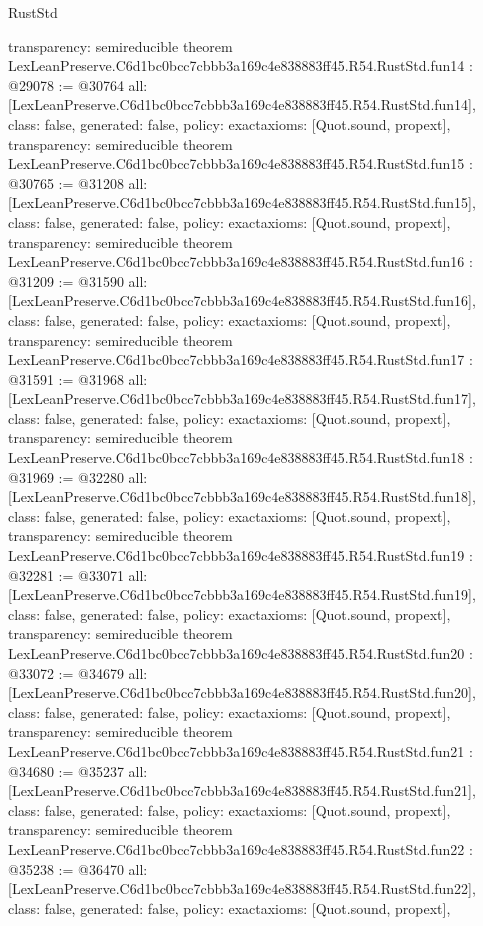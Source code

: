 \begin{lexlean}{RustStd}
\begin{coremodule}
{  transparency: semireducible
}
theorem LexLeanPreserve.C6d1bc0bcc7cbbb3a169c4e838883ff45.R54.RustStd.fun14 : @29078 := @30764 {
  all: [LexLeanPreserve.C6d1bc0bcc7cbbb3a169c4e838883ff45.R54.RustStd.fun14],
  class: false,
  generated: false,
  policy: exact{axioms: [Quot.sound, propext]},
  transparency: semireducible
}
theorem LexLeanPreserve.C6d1bc0bcc7cbbb3a169c4e838883ff45.R54.RustStd.fun15 : @30765 := @31208 {
  all: [LexLeanPreserve.C6d1bc0bcc7cbbb3a169c4e838883ff45.R54.RustStd.fun15],
  class: false,
  generated: false,
  policy: exact{axioms: [Quot.sound, propext]},
  transparency: semireducible
}
theorem LexLeanPreserve.C6d1bc0bcc7cbbb3a169c4e838883ff45.R54.RustStd.fun16 : @31209 := @31590 {
  all: [LexLeanPreserve.C6d1bc0bcc7cbbb3a169c4e838883ff45.R54.RustStd.fun16],
  class: false,
  generated: false,
  policy: exact{axioms: [Quot.sound, propext]},
  transparency: semireducible
}
theorem LexLeanPreserve.C6d1bc0bcc7cbbb3a169c4e838883ff45.R54.RustStd.fun17 : @31591 := @31968 {
  all: [LexLeanPreserve.C6d1bc0bcc7cbbb3a169c4e838883ff45.R54.RustStd.fun17],
  class: false,
  generated: false,
  policy: exact{axioms: [Quot.sound, propext]},
  transparency: semireducible
}
theorem LexLeanPreserve.C6d1bc0bcc7cbbb3a169c4e838883ff45.R54.RustStd.fun18 : @31969 := @32280 {
  all: [LexLeanPreserve.C6d1bc0bcc7cbbb3a169c4e838883ff45.R54.RustStd.fun18],
  class: false,
  generated: false,
  policy: exact{axioms: [Quot.sound, propext]},
  transparency: semireducible
}
theorem LexLeanPreserve.C6d1bc0bcc7cbbb3a169c4e838883ff45.R54.RustStd.fun19 : @32281 := @33071 {
  all: [LexLeanPreserve.C6d1bc0bcc7cbbb3a169c4e838883ff45.R54.RustStd.fun19],
  class: false,
  generated: false,
  policy: exact{axioms: [Quot.sound, propext]},
  transparency: semireducible
}
theorem LexLeanPreserve.C6d1bc0bcc7cbbb3a169c4e838883ff45.R54.RustStd.fun20 : @33072 := @34679 {
  all: [LexLeanPreserve.C6d1bc0bcc7cbbb3a169c4e838883ff45.R54.RustStd.fun20],
  class: false,
  generated: false,
  policy: exact{axioms: [Quot.sound, propext]},
  transparency: semireducible
}
theorem LexLeanPreserve.C6d1bc0bcc7cbbb3a169c4e838883ff45.R54.RustStd.fun21 : @34680 := @35237 {
  all: [LexLeanPreserve.C6d1bc0bcc7cbbb3a169c4e838883ff45.R54.RustStd.fun21],
  class: false,
  generated: false,
  policy: exact{axioms: [Quot.sound, propext]},
  transparency: semireducible
}
theorem LexLeanPreserve.C6d1bc0bcc7cbbb3a169c4e838883ff45.R54.RustStd.fun22 : @35238 := @36470 {
  all: [LexLeanPreserve.C6d1bc0bcc7cbbb3a169c4e838883ff45.R54.RustStd.fun22],
  class: false,
  generated: false,
  policy: exact{axioms: [Quot.sound, propext]},
}
\end{coremodule}
\end{lexlean}
